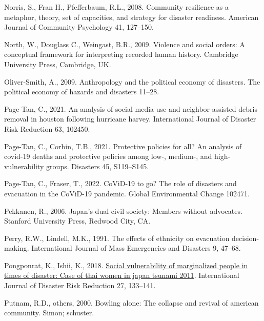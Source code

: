\documentclass[]{elsarticle} %
\newlength{\cslhangindent}
\newlength{\cslentryspacingunit} %
\newenvironment{CSLReferences}[2] %
 {%
  \setlength{\parindent}{0pt}
  \ifodd #1
  \let\oldpar\par
  \def\par{\hangindent=\cslhangindent\oldpar}
  \fi
  \setlength{\parskip}{#2\cslentryspacingunit}
 }%
 {}
\begin{document}
\begin{CSLReferences}{1}{0}
\leavevmode{}%
Norris, S., Fran H., Pfefferbaum, R.L., 2008. Community resilience as a
metaphor, theory, set of capacities, and strategy for disaster
readiness. American Journal of Community Psychology 41, 127--150.

\leavevmode{}%
North, W., Douglass C., Weingast, B.R., 2009. Violence and social
orders: A conceptual framework for interpreting recorded human history.
Cambridge University Press, Cambridge, UK.

\leavevmode{}%
Oliver-Smith, A., 2009. Anthropology and the political economy of
disasters. The political economy of hazards and disasters 11--28.

\leavevmode{}%
Page-Tan, C., 2021. An analysis of social media use and
neighbor-assisted debris removal in houston following hurricane harvey.
International Journal of Disaster Risk Reduction 63, 102450.

\leavevmode{}%
Page-Tan, C., Corbin, T.B., 2021. Protective policies for all? An
analysis of covid-19 deaths and protective policies among low-, medium-,
and high-vulnerability groups. Disasters 45, S119--S145.

\leavevmode{}%
Page-Tan, C., Fraser, T., 2022. CoViD-19 to go? The role of disasters
and evacuation in the CoViD-19 pandemic. Global Environmental Change
102471.

\leavevmode{}%
Pekkanen, R., 2006. Japan's dual civil society: Members without
advocates. Stanford University Press, Redwood City, CA.

\leavevmode{}%
Perry, R.W., Lindell, M.K., 1991. The effects of ethnicity on evacuation
decision-making. International Journal of Mass Emergencies and Disasters
9, 47--68.

\leavevmode{}%
Pongponrat, K., Ishii, K., 2018.
\href{https://doi.org/10.1016/j.ijdrr.2017.09.047}{Social vulnerability
of marginalized people in times of disaster: Case of thai women in japan
tsunami 2011}. International Journal of Disaster Risk Reduction 27,
133--141.

\leavevmode{}%
Putnam, R.D., others, 2000. Bowling alone: The collapse and revival of
american community. Simon; schuster.


\end{CSLReferences}
\end{document}
